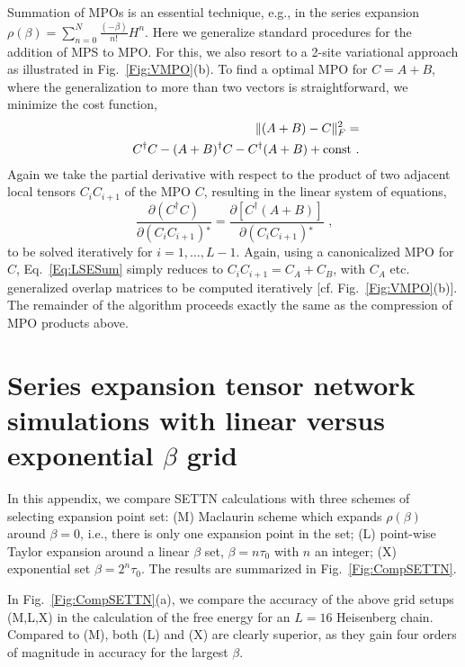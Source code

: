 \documentclass[aps,prx,twocolumn,showpacs,psfig,superscriptaddress,longbibliography]{revtex4-1}
\newcommand{\Eq}[1]{Eq.~\eqref{#1}}
\newcommand{\Fig}[1]{Fig.~\ref{#1}}
\def\taui{\tau_0}
\begin{document}
Summation of MPOs is an essential technique, e.g., in the series
expansion $\rho(\beta) = \sum_{n=0}^{N} \frac{(-\beta)}{n!}H^n$.
Here we generalize standard procedures for the addition of MPS to
MPO. For this, we also resort to a 2-site variational approach as
illustrated in \Fig{Fig:VMPO}(b).  To find a optimal MPO for $C = A
+ B$, where the generalization to more than two vectors is
straightforward, we minimize the cost function, 
%
\begin{eqnarray}
&& \Vert (A+B)-C \Vert_F^2 = \notag \\
&& \ \ \ C^{\dagger}C - (A+B)^{\dagger}C-C^{\dagger}(A+B) 
+ \mathrm{const}
\text{ .}\label{eq:MPO:plus}
\end{eqnarray}
%
Again we take the partial derivative with respect to the product of
two adjacent local tensors $C_i C_{i+1}$ of the MPO $C$, resulting
in the linear system of equations,
\begin{equation}
   \frac{\partial(C^{\dagger}C)}{\partial (C_i C_{i+1}){^\ast}} =
   \frac{\partial [C^{\dagger}(A+B)]}{\partial (C_i C_{i+1}){^\ast}}
\text{ ,}
\label{Eq:LSESum}
\end{equation}
%
to be solved iteratively for $i=1, \ldots, L-1$.  Again, using a
canonicalized MPO for $C$, \Eq{Eq:LSESum} simply reduces to $C_i
C_{i+1} = C_A + C_B$, with $C_A$ etc. generalized overlap matrices
to be computed iteratively [cf. \Fig{Fig:VMPO}(b)].  The remainder
of the algorithm proceeds exactly the same as the compression of MPO
products above.

\section{Series expansion tensor network simulations with linear versus
exponential $\beta$ grid} \label{App:LvsX}

In this appendix, we compare SETTN calculations with three schemes
of selecting expansion point set: (M) Maclaurin scheme which expands
$\rho(\beta)$ around $\beta=0$, i.e., there is only one expansion
point in the set; (L) point-wise Taylor expansion around a linear
$\beta$ set, $\beta = n \taui$ with $n$ an integer; (X) exponential
set $\beta=2^n \taui$.  The results are summarized in
\Fig{Fig:CompSETTN}.

In \Fig{Fig:CompSETTN}(a), we compare the accuracy of the above grid
setups (M,L,X) in the calculation of the free energy for an $L=16$
Heisenberg chain.  Compared to (M), both (L) and (X) are clearly
superior, as they gain four orders of magnitude in accuracy for the
largest $\beta$.
\end{document}
